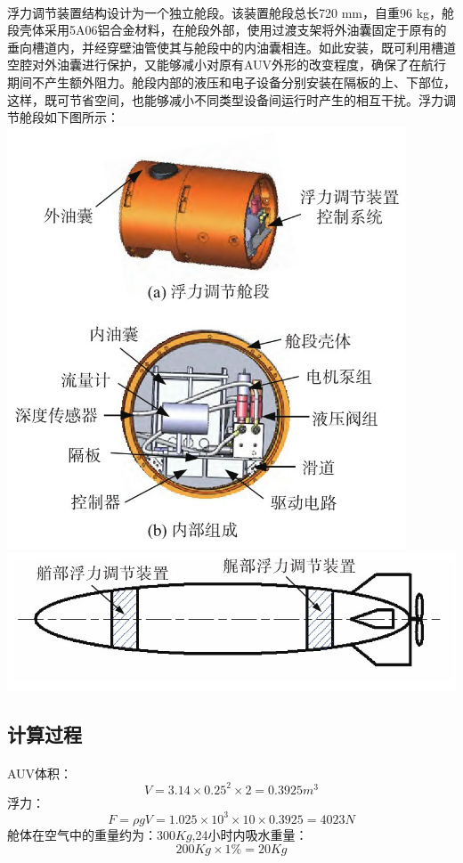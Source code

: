 \documentclass{ctexart}
\begin{document}
\paragraph{}浮力调节装置结构设计为一个独立舱段。该装置舱段总长720 mm，自重96 kg，舱段壳体采用5A06铝合金材料，在舱段外部，使用过渡支架将外油囊固定于原有的垂向槽道内，并经穿壁油管使其与舱段中的内油囊相连。如此安装，既可利用槽道空腔对外油囊进行保护，又能够减小对原有AUV外形的改变程度，确保了在航行期间不产生额外阻力。舱段内部的液压和电子设备分别安装在隔板的上、下部位，这样，既可节省空间，也能够减小不同类型设备间运行时产生的相互干扰。浮力调节舱段如下图所示：\\
\includegraphics[scale=1]{./fulitiaojie.png}
\includegraphics[scale=1.6]{./fulitiaojie2.png}
\clearpage
\subsection{计算过程}
\paragraph{}AUV体积： 
\[V=3.14\times 0.25^2 \times 2=0.3925m^3\]
浮力：
\[F=\rho gV=1.025\times 10^3\times 10\times 0.3925=4023N \]
舱体在空气中的重量约为：$300Kg$,24小时内吸水重量：
\[200Kg\times 1\%=20Kg\]
\end{document}
